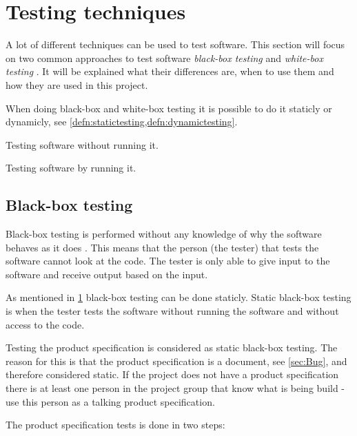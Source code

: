 \section{Testing techniques} \label{sec:testingtechniques}
A lot of different techniques can be used to test software.
This section will focus on two common approaches to test software \textit{black-box testing} and \textit{white-box testing} \cite{SoftwareTesting}.
It will be explained what their differences are, when to use them and how they are used in this project.

When doing black-box and white-box testing it is possible to do it staticly or dynamicly, see \cref{defn:statictesting,defn:dynamictesting}.

\begin{defn} \label{defn:statictesting}
Testing software without running it.
\end{defn}

\begin{defn} \label{defn:dynamictesting}
Testing software by running it.
\end{defn}

\subsection{Black-box testing} \label{sec:blackboxtesting}
Black-box testing is performed without any knowledge of why the software behaves as it does \cite{SoftwareTesting}.
This means that the person (the tester) that tests the software cannot look at the code.
The tester is only able to give input to the software and receive output based on the input.

As mentioned in \cref{sec:testingtechniques} black-box testing can be done staticly.
Static black-box testing is when the tester tests the software without running the software and without access to the code.

Testing the product specification is considered as static black-box testing.
The reason for this is that the product specification is a document, see \cref{sec:Bug}, and therefore considered static.
If the project does not have a product specification there is at least one person in the project group that know what is being build - use this person as a talking product specification. \cite{SoftwareTesting}

The product specification tests is done in two steps:

